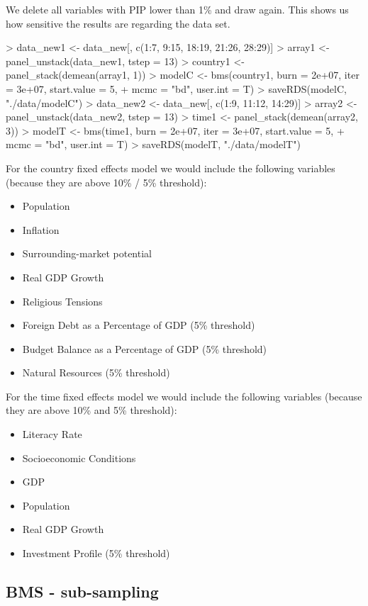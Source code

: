 \documentclass{article}
\begin{document}
We delete all variables with PIP lower than 1\% and draw again. This shows us how sensitive the results are regarding the data set.
\begin{Schunk}
\begin{Sinput}
> data_new1 <- data_new[, c(1:7, 9:15, 18:19, 21:26, 28:29)]
> array1 <- panel_unstack(data_new1, tstep = 13)
> country1 <- panel_stack(demean(array1, 1))
> modelC <- bms(country1, burn = 2e+07, iter = 3e+07, start.value = 5, 
+     mcmc = "bd", user.int = T)
> saveRDS(modelC, "./data/modelC")
> data_new2 <- data_new[, c(1:9, 11:12, 14:29)]
> array2 <- panel_unstack(data_new2, tstep = 13)
> time1 <- panel_stack(demean(array2, 3))
> modelT <- bms(time1, burn = 2e+07, iter = 3e+07, start.value = 5, 
+     mcmc = "bd", user.int = T)
> saveRDS(modelT, "./data/modelT")
\end{Sinput}
\end{Schunk}
For the country fixed effects model we would include the following variables (because they are above 10\% / 5\% threshold):
\begin{itemize}
\item Population
\item Inflation
\item Surrounding-market potential
\item Real GDP Growth
\item Religious Tensions
\item Foreign Debt as a Percentage of GDP (5\% threshold)
\item Budget Balance as a Percentage of GDP (5\% threshold)
\item Natural Resources (5\% threshold)
\end{itemize}

For the time fixed effects model we would include the following variables (because they are above 10\% and 5\% threshold):
\begin{itemize}
\item Literacy Rate
\item Socioeconomic Conditions
\item GDP
\item Population
\item Real GDP Growth
\item Investment Profile (5\% threshold)
\end{itemize}


\subsection{BMS - sub-sampling}
\end{document}
